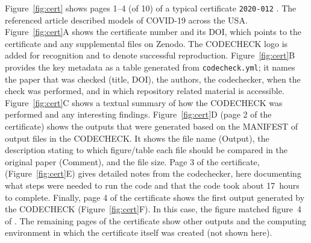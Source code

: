 \documentclass[12pt]{article}
\begin{document}
Figure~\ref{fig:cert} shows pages 1--4 (of 10) of a typical
certificate \texttt{2020-012} \cite{cert-2020-012}.  The referenced
article \cite{unwin_report_2020} described models of COVID-19 across
the USA.  Figure~\ref{fig:cert}A shows the certificate number and its
DOI, which points to the certificate and any supplemental files on
Zenodo.  The CODECHECK logo is added for recognition and to denote
successful reproduction.  Figure~\ref{fig:cert}B provides the key
metadata as a table generated from \texttt{codecheck.yml}; it names
the paper that was checked (title, DOI), the authors, the codechecker,
when the check was performed, and in which repository related material
is accessible.  Figure~\ref{fig:cert}C shows a textual summary of how
the CODECHECK was performed and any interesting findings.
Figure~\ref{fig:cert}D (page 2 of the certificate) shows the outputs
that were generated based on the MANIFEST of output files in the
CODECHECK.  It shows the file name (Output), the description stating
to which figure/table each file should be compared in the original
paper (Comment), and the file size.  Page 3 of the certificate,
(Figure~\ref{fig:cert}E) gives detailed notes from the codechecker,
here documenting what steps were needed to run the code and that the
code took about 17~hours to complete. Finally, page 4 of the
certificate shows the first output generated by the CODECHECK
(Figure~\ref{fig:cert}F). In this case, the figure matched figure~4 of
\cite{unwin_report_2020}.  The remaining pages of the certificate show
other outputs and the computing environment in which the certificate
itself was created (not shown here).
\end{document}

